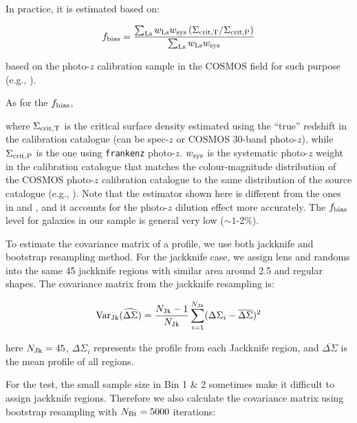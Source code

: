 \documentclass[fleqn,usenatbib,useAMS]{mnras}
\begin{document}
\begin{CJK*}{UTF8}{gbsn}
    In practice, it is estimated based on:

    \begin{equation}
        f_{\rm bias} = \frac{
            \sum_{\rm Ls} w_{\rm Ls} w_{\rm sys} \left(\Sigma_{{\rm crit, T}} / \Sigma_{{\rm crit, P}} \right)}
            {\sum_{\rm Ls} w_{\rm Ls} w_{\rm sys}}
        \label{eq:fbias}
    \end{equation}

    based on the photo-$z$ calibration sample in the COSMOS field for
    such purpose
    (e.g., \citealt{Mandelbaum2008, Nakajima2012, Leauthaud2017}).

    As for the $f_{\rm bias}$,

    \noindent where $\Sigma_{{\rm crit, T}}$ is the critical surface density estimated using the
    ``true'' redshift in the calibration catalogue (can be spec-$z$ or COSMOS 30-band photo-$z$),
    while $\Sigma_{{\rm crit, P}}$ is the one using \texttt{frankenz} photo-$z$.
    $w_{\rm sys}$ is the systematic photo-$z$ weight in the calibration catalogue that matches the
    colour-magnitude distribution of the COSMOS photo-$z$ calibration catalogue to the same
    distribution of the source catalogue (e.g., \citealt{Mandelbaum2008, Nakajima2012}).
    Note that the estimator shown here is different from the ones in \citet{Leauthaud2017} and
    \citet{Speagle2019}, and it accounts for the photo-$z$ dilution effect more accurately.
    The $f_{\rm bias}$ level for galaxies in our sample is general very low ($\sim 1$-2\%).

    To estimate the covariance matrix of a \dsigma{} profile, we use both jackknife and
    bootstrap resampling method.
    For the jackknife case, we assign lens and randoms into the same 45 jackknife regions with
    similar area around 2.5 \sqdeg{} and regular shapes.
    The covariance matrix from the jackknife resampling is:

    \begin{equation}
        \mathrm{Var}_{\rm Jk}(\widehat{\Delta\Sigma}) = \frac{N_{\rm Jk} - 1}{N_{\rm Jk}} \sum\limits_{i=1}^{N_{\rm Jk}} (\Delta\Sigma_{i} - \overline{\Delta\Sigma})^2
    \end{equation}

    \noindent here $N_{\rm Jk}=45$, $\Delta\Sigma_{i}$ represents the \dsigma{} profile from each
    Jackknife region, and $\overline{\Delta\Sigma}$ is the mean profile of all regions.

    For the \topn{} test, the small sample size in Bin 1 \& 2 sometimes make it difficult to assign
    jackknife regions. Therefore we also calculate the covariance matrix using bootstrap resampling
    with $N_{\rm Bt}=5000$ iterations:


\end{CJK*}
\end{document}
